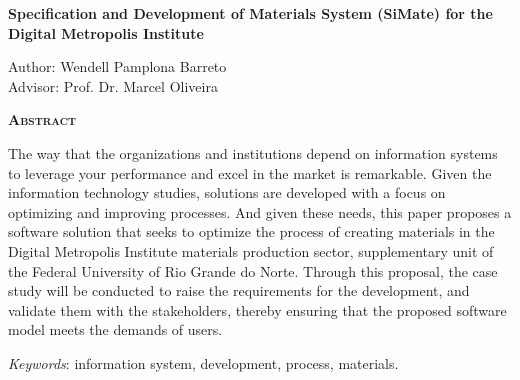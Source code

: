 \begin{center}
	{\Large{\textbf{Specification and Development of Materials System (SiMate) for the Digital Metropolis Institute}}}
\end{center}

\vspace{1cm}

\begin{flushright}
	Author: Wendell Pamplona Barreto\\
	Advisor: Prof. Dr. Marcel Oliveira
\end{flushright}

\vspace{1cm}

\begin{center}
	\Large{\textsc{\textbf{Abstract}}}
\end{center}

\noindent The way that the organizations and institutions depend on information systems to leverage your performance and excel in the market is remarkable. Given the information technology studies, solutions are developed with a focus on optimizing and improving processes. And given these needs, this paper proposes a software solution that seeks to optimize the process of creating materials in the Digital Metropolis Institute materials production sector, supplementary unit of the Federal University of Rio Grande do Norte. Through this proposal, the case study will be conducted to raise the requirements for the development, and validate them with the stakeholders, thereby ensuring that the proposed software model meets the demands of users.

\noindent\textit{Keywords}: information system, development, process, materials.